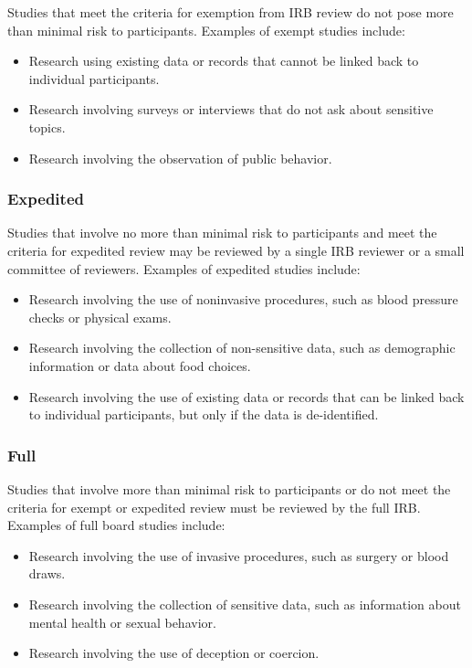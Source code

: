 \documentclass[
  b5paper]{book}
\begin{document}
Studies that meet the criteria for exemption from IRB review do not pose more than minimal risk to participants. Examples of exempt studies include:

\begin{itemize}
\item
  Research using existing data or records that cannot be linked back to individual participants.
\item
  Research involving surveys or interviews that do not ask about sensitive topics.
\item
  Research involving the observation of public behavior.
\end{itemize}

\hypertarget{expedited}{%
\subsubsection*{Expedited}\label{expedited}}

Studies that involve no more than minimal risk to participants and meet the criteria for expedited review may be reviewed by a single IRB reviewer or a small committee of reviewers. Examples of expedited studies include:

\begin{itemize}
\item
  Research involving the use of noninvasive procedures, such as blood pressure checks or physical exams.
\item
  Research involving the collection of non-sensitive data, such as demographic information or data about food choices.
\item
  Research involving the use of existing data or records that can be linked back to individual participants, but only if the data is de-identified.
\end{itemize}

\hypertarget{full}{%
\subsubsection*{Full}\label{full}}

Studies that involve more than minimal risk to participants or do not meet the criteria for exempt or expedited review must be reviewed by the full IRB. Examples of full board studies include:

\begin{itemize}
\item
  Research involving the use of invasive procedures, such as surgery or blood draws.
\item
  Research involving the collection of sensitive data, such as information about mental health or sexual behavior.
\item
  Research involving the use of deception or coercion.
\end{itemize}
\end{document}
